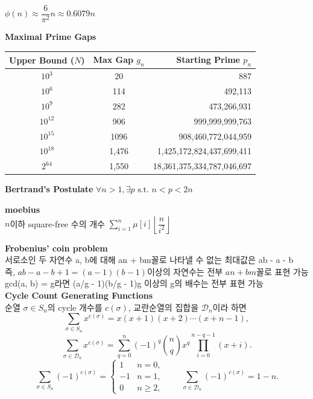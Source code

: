 \vspace{5pt}
\noindent $\phi(n) \approx \dfrac{6}{\pi^2}n \approx 0.6079n$

\vspace{5pt}
\noindent \textbf{Maximal Prime Gaps} \\
\begin{flushleft}
\noindent
\begin{tabular}{|c|c|r|}
\hline
Upper Bound ($N$) & Max Gap $g_n$ & Starting Prime $p_n$ \\ \hline
$10^3$ & 20 & 887 \\ \hline
$10^6$ & 114 & 492,113 \\ \hline
$10^9$ & 282 & 473,266,931 \\ \hline
$10^{12}$ & 906 & 999,999,999,763 \\ \hline
$10^{15}$ & 1096 & 908,460,772,044,959 \\ \hline
$10^{18}$ & 1,476 & 1,425,172,824,437,699,411 \\ \hline
$2^{64}$ & 1,550 & 18,361,375,334,787,046,697 \\ \hline
\end{tabular}
\end{flushleft}

\vspace{5pt}
\noindent \textbf{Bertrand's Postulate}
$\forall n > 1, \exists p \text{ s.t. } n < p < 2n$

\vspace{5pt}
\noindent \textbf{moebius} \\
$n$이하 square-free 수의 개수 $\displaystyle\sum_{i=1}^{n} \mu[i] \left\lfloor \dfrac{n}{i^2} \right\rfloor$   

\vspace{5pt}
\noindent \textbf{Frobenius' coin problem} \\
서로소인 두 자연수 a, b에 대해 an + bm꼴로 나타낼 수 없는 최대값은 ab - a - b \\
즉, $ab - a - b + 1 = (a-1)(b-1)$이상의 자연수는 전부 $an+bm$꼴로 표현 가능 \\
gcd(a, b) = g라면 (a/g - 1)(b/g - 1)g 이상의 g의 배수는 전부 표현 가능 \\

\vspace{5pt}
\noindent \textbf{Cycle Count Generating Functions} \\
순열 $\sigma \in S_n$의 cycle 개수를 $c(\sigma)$, 교란순열의 집합을 $\mathcal{D}_n$이라 하면
\[
\sum_{\sigma \in S_n} x^{c(\sigma)}
=
x(x+1)(x+2)\cdots(x+n-1),
\]
\[
\sum_{\sigma \in \mathcal{D}_n} x^{c(\sigma)}
=
\sum_{q=0}^{n}(-1)^q\binom{n}{q}x^q
\prod_{i=0}^{n-q-1}(x+i).
\]
\[
\sum_{\sigma \in S_n}(-1)^{c(\sigma)}
=
\begin{cases}
1 & n=0,\\
-1 & n=1,\\
0 & n\ge 2,
\end{cases}
\qquad
\sum_{\sigma \in \mathcal{D}_n}(-1)^{c(\sigma)}
=
1-n.
\]

